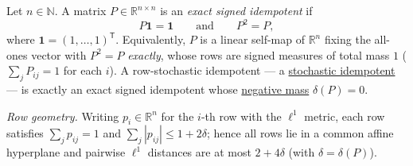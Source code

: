 \hypertarget{def:signed-idempotent}{}%
\begin{definition}\label{def:signed-idempotent}
Let $n\in\mathbb N$. A matrix $P\in\mathbb R^{n\times n}$ is an
\emph{exact signed idempotent} if
\[P\mathbf 1=\mathbf 1\qquad\text{and}\qquad P^2=P,\]
where $\mathbf 1=(1,\dots,1)^{\mathsf T}$. Equivalently, $P$ is a linear self-map of $\mathbb R^n$ fixing
the all-ones vector with $P^2=P$ \emph{exactly}, whose rows are signed measures of total mass $1$
($\sum_j P_{ij}=1$ for each $i$). A row-stochastic idempotent --- a \hyperref[def:stochastic]{stochastic idempotent}
--- is exactly an exact signed idempotent whose \hyperref[def:negative-mass]{negative mass} $\delta(P)=0$.

\emph{Row geometry.} Writing $p_i\in\mathbb R^n$ for the $i$-th row with the $\ell^1$ metric, each row
satisfies $\sum_j p_{ij}=1$ and $\sum_j|p_{ij}|\le1+2\delta$; hence all rows lie in a common affine
hyperplane and pairwise $\ell^1$ distances are at most $2+4\delta$ (with $\delta=\delta(P)$).
\end{definition}
